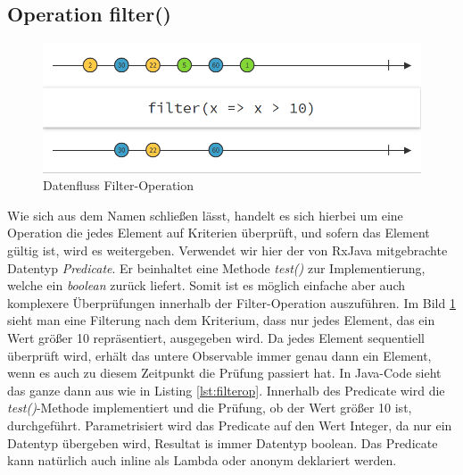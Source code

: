 \subsection{Operation filter()}
\begin{figure}[hbt]
	\centering
	\includegraphics[width=1\textwidth]{Abb/filter}
	\caption{Datenfluss Filter-Operation}
	\label{pic:filter}
\end{figure}

Wie sich aus dem Namen schließen lässt, handelt es sich hierbei um eine Operation die jedes Element auf Kriterien überprüft, und sofern das Element gültig ist, wird es weitergeben. Verwendet wir hier der von RxJava mitgebrachte Datentyp \textit{Predicate}. Er beinhaltet eine Methode \textit{test()} zur Implementierung, welche ein \textit{boolean} zurück liefert. Somit ist es möglich einfache aber auch komplexere Überprüfungen innerhalb der Filter-Operation auszuführen. Im Bild \ref{pic:filter} sieht man eine Filterung nach dem Kriterium, dass nur jedes Element, das ein Wert größer 10 repräsentiert, ausgegeben wird. Da jedes Element sequentiell überprüft wird, erhält das untere Observable immer genau dann ein Element, wenn es auch zu diesem Zeitpunkt die Prüfung passiert hat. In Java-Code sieht das ganze dann aus wie in Listing \ref{lst:filterop}. Innerhalb des Predicate wird die \textit{test()}-Methode implementiert und die Prüfung, ob der Wert größer 10 ist, durchgeführt. 
Parametrisiert wird das Predicate auf den Wert Integer, da nur ein Datentyp übergeben wird, Resultat is immer Datentyp boolean. Das Predicate kann natürlich auch inline als Lambda oder anonym deklariert werden.
